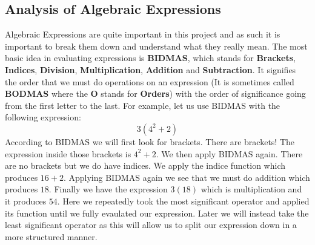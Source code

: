 \documentclass[../../../../../main.tex]{subfiles}
\begin{document}
\subsection{Analysis of Algebraic Expressions}
Algebraic Expressions are quite important in this project and as such it is important to break them down and understand what they really mean. The most basic idea in evaluating expressions is \textbf{BIDMAS}, which stands for \textbf{Brackets}, \textbf{Indices}, \textbf{Division}, \textbf{Multiplication}, \textbf{Addition} and \textbf{Subtraction}. It signifies the order that we must do operations on an expression (It is sometimes called \textbf{BODMAS} where the \textbf{O} stands for \textbf{Orders}) with the order of significance going from the first letter to the last. For example, let us use BIDMAS with the following expression:
\[3(4^2+2)\]
According to BIDMAS we will first look for brackets. There are brackets! The expression inside those brackets is $4^2+2$. We then apply BIDMAS again. There are no brackets but we do have indices. We apply the indice function which produces $16+2$. Applying BIDMAS again we see that we must do addition which produces $18$. Finally we have the expression $3(18)$ which is multiplication and it produces $54$. Here we repeatedly took the most significant operator and applied its function until we fully evaulated our expression. Later we will instead take the least significant operator as this will allow us to split our expression down in a more structured manner.
\end{document}

